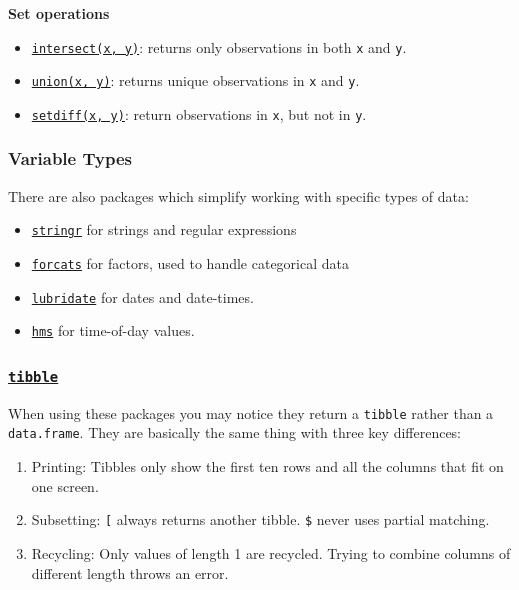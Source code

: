 \documentclass[]{book}
\providecommand{\tightlist}{%
  \setlength{\itemsep}{0pt}\setlength{\parskip}{0pt}}
\theoremstyle{definition}
\theoremstyle{definition}
\theoremstyle{definition}
\theoremstyle{remark}
\begin{document}
\textbf{Set operations}

\begin{itemize}
\tightlist
\item
  \href{http://dplyr.tidyverse.org/reference/setops.html}{\texttt{intersect(x,\ y)}}:
  returns only observations in both \texttt{x} and \texttt{y}.
\item
  \href{http://dplyr.tidyverse.org/reference/setops.html}{\texttt{union(x,\ y)}}:
  returns unique observations in \texttt{x} and \texttt{y}.
\item
  \href{http://dplyr.tidyverse.org/reference/setops.html}{\texttt{setdiff(x,\ y)}}:
  return observations in \texttt{x}, but not in \texttt{y}.
\end{itemize}

\subsubsection{Variable Types}\label{variable-types}

There are also packages which simplify working with specific types of
data:

\begin{itemize}
\tightlist
\item
  \href{http://stringr.tidyverse.org/}{\texttt{stringr}} for strings and
  regular expressions
\item
  \href{http://forcats.tidyverse.org/}{\texttt{forcats}} for factors,
  used to handle categorical data
\item
  \href{http://lubridate.tidyverse.org/}{\texttt{lubridate}} for dates
  and date-times.
\item
  \href{https://www.rdocumentation.org/packages/hms}{\texttt{hms}} for
  time-of-day values.
\end{itemize}

\subsubsection{\texorpdfstring{\href{http://tibble.tidyverse.org/}{\texttt{tibble}}}{tibble}}\label{tibble}

When using these packages you may notice they return a \texttt{tibble}
rather than a \texttt{data.frame}. They are basically the same thing
with three key differences:

\begin{enumerate}
\def\labelenumi{\arabic{enumi}.}
\tightlist
\item
  Printing: Tibbles only show the first ten rows and all the columns
  that fit on one screen.
\item
  Subsetting: \texttt{{[}} always returns another tibble. \texttt{\$}
  never uses partial matching.
\item
  Recycling: Only values of length 1 are recycled. Trying to combine
  columns of different length throws an error.
\end{enumerate}
\end{document}
